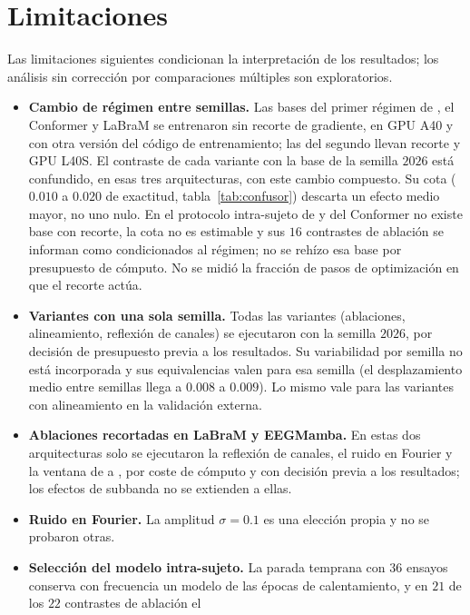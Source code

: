 \section{Limitaciones}
\label{sec:limitaciones}

Las limitaciones siguientes condicionan la interpretación de los resultados; los análisis sin corrección
por comparaciones múltiples son exploratorios.

\begin{itemize}
  \item \textbf{Cambio de régimen entre semillas.} Las bases del primer régimen de \eegnet{}, el Conformer y
        LaBraM se entrenaron sin recorte de gradiente, en GPU A40 y con otra versión del código de entrenamiento; las del segundo llevan recorte y GPU L40S. El contraste de cada variante con la base de la
        semilla $2026$ está confundido, en esas tres arquitecturas, con este cambio compuesto. Su cota
        ($0.010$ a $0.020$ de exactitud, tabla~\ref{tab:confusor}) descarta un efecto medio mayor, no uno nulo.
        En el protocolo intra-sujeto de \eegnet{} y del Conformer no existe base con recorte, la cota no es
        estimable y sus $16$ contrastes de ablación se informan como condicionados al régimen; no se
        rehízo esa base por presupuesto de cómputo. No se midió la fracción de pasos de
        optimización en que el recorte actúa.
  \item \textbf{Variantes con una sola semilla.} Todas las variantes (ablaciones, alineamiento, reflexión de
        canales) se ejecutaron con la semilla $2026$, por decisión de presupuesto previa a los resultados.
        Su variabilidad por semilla no está incorporada y sus equivalencias valen para esa semilla (el
        desplazamiento medio entre semillas llega a $0.008$ a $0.009$). Lo mismo vale para las variantes con
        alineamiento en la validación externa.
  \item \textbf{Ablaciones recortadas en LaBraM y EEGMamba.} En estas dos arquitecturas solo se ejecutaron la
        reflexión de canales, el ruido en Fourier y la ventana de  a , por coste de cómputo y
        con decisión previa a los resultados; los efectos de subbanda no se extienden a ellas.
  \item \textbf{Ruido en Fourier.} La amplitud $\sigma = 0.1$ es una elección propia y no se probaron otras.
  \item \textbf{Selección del modelo intra-sujeto.} La parada temprana con $36$ ensayos conserva con
        frecuencia un modelo de las épocas de calentamiento, y en $21$ de los $22$ contrastes de ablación el

\end{itemize}
